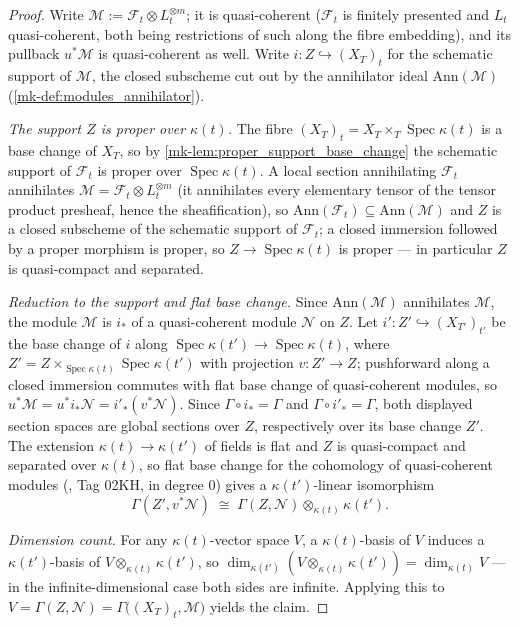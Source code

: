 \begin{proof}
  Write \(\mathcal{M} := \mathcal{F}_t \otimes L_t^{\otimes m}\); it is
  quasi-coherent (\(\mathcal{F}_t\) is finitely presented and \(L_t\)
  quasi-coherent, both being restrictions of such along the fibre
  embedding), and its pullback \(u^*\mathcal{M}\) is quasi-coherent as well.
  Write \(i : Z \hookrightarrow (X_T)_t\) for the schematic support of
  \(\mathcal{M}\), the closed subscheme cut out by the annihilator ideal
  \(\mathrm{Ann}(\mathcal{M})\) (\ref{mk-def:modules_annihilator}).

  \emph{The support \(Z\) is proper over \(\kappa(t)\).}  The fibre
  \((X_T)_t = X_T \times_T \operatorname{Spec} \kappa(t)\) is a base change
  of \(X_T\), so by \ref{mk-lem:proper_support_base_change} the schematic
  support of \(\mathcal{F}_t\) is proper over
  \(\operatorname{Spec} \kappa(t)\).  A local section annihilating
  \(\mathcal{F}_t\) annihilates \(\mathcal{M} = \mathcal{F}_t \otimes
  L_t^{\otimes m}\) (it annihilates every elementary tensor of the tensor
  product presheaf, hence the sheafification), so
  \(\mathrm{Ann}(\mathcal{F}_t) \subseteq \mathrm{Ann}(\mathcal{M})\) and
  \(Z\) is a closed subscheme of the schematic support of
  \(\mathcal{F}_t\); a closed immersion followed by a proper morphism is
  proper, so \(Z \to \operatorname{Spec} \kappa(t)\) is proper — in
  particular \(Z\) is quasi-compact and separated.

  \emph{Reduction to the support and flat base change.}  Since
  \(\mathrm{Ann}(\mathcal{M})\) annihilates \(\mathcal{M}\), the module
  \(\mathcal{M}\) is \(i_*\) of a quasi-coherent module \(\mathcal{N}\) on
  \(Z\).  Let \(i' : Z' \hookrightarrow (X_{T'})_{t'}\) be the base change of
  \(i\) along \(\operatorname{Spec} \kappa(t') \to
  \operatorname{Spec} \kappa(t)\), where
  \(Z' = Z \times_{\operatorname{Spec} \kappa(t)}
  \operatorname{Spec} \kappa(t')\) with projection \(v : Z' \to Z\);
  pushforward along a closed immersion commutes with flat base change of
  quasi-coherent modules, so \(u^*\mathcal{M} = u^* i_* \mathcal{N} =
  i'_* (v^* \mathcal{N})\).  Since \(\Gamma \circ i_* = \Gamma\) and
  \(\Gamma \circ i'_* = \Gamma\), both displayed section spaces are global
  sections over \(Z\), respectively over its base change \(Z'\).  The
  extension \(\kappa(t) \to \kappa(t')\) of fields is flat and \(Z\) is
  quasi-compact and separated over \(\kappa(t)\), so flat base change for
  the cohomology of quasi-coherent modules (\cite{stacks-project}, Tag 02KH, in
  degree \(0\)) gives a \(\kappa(t')\)-linear isomorphism
  \[
    \Gamma(Z', v^*\mathcal{N})
    \;\cong\;
    \Gamma(Z, \mathcal{N}) \otimes_{\kappa(t)} \kappa(t').
  \]

  \emph{Dimension count.}  For any \(\kappa(t)\)-vector space \(V\), a
  \(\kappa(t)\)-basis of \(V\) induces a \(\kappa(t')\)-basis of
  \(V \otimes_{\kappa(t)} \kappa(t')\), so
  \(\dim_{\kappa(t')}(V \otimes_{\kappa(t)} \kappa(t')) =
  \dim_{\kappa(t)} V\) — in the infinite-dimensional case both sides are
  infinite.  Applying this to \(V = \Gamma(Z, \mathcal{N}) =
  \Gamma\bigl((X_T)_t, \mathcal{M}\bigr)\) yields the claim.
\end{proof}


